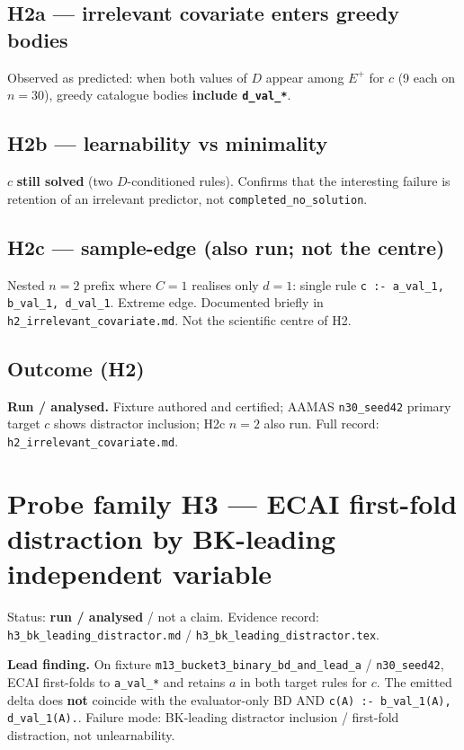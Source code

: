 \documentclass[11pt]{article}
\begin{document}
\subsection{H2a --- irrelevant covariate enters greedy bodies}

Observed as predicted: when both values of \(D\) appear among \(E^+\) for \(c\)
(9 each on \(n{=}30\)), greedy catalogue bodies \textbf{include
\texttt{d\_val\_*}}.

\subsection{H2b --- learnability vs minimality}

\(c\) \textbf{still solved} (two \(D\)-conditioned rules).
Confirms that the interesting failure is retention of an irrelevant predictor,
not \texttt{completed\_no\_solution}.

\subsection{H2c --- sample-edge (also run; not the centre)}

Nested \(n{=}2\) prefix where \(C{=}1\) realises only \(d{=}1\): single rule
\texttt{c :- a\_val\_1, b\_val\_1, d\_val\_1}.
Extreme edge.
Documented briefly in \texttt{h2\_irrelevant\_covariate.md}.
Not the scientific centre of H2.

\subsection{Outcome (H2)}

\textbf{Run / analysed.}
Fixture authored and certified; AAMAS \texttt{n30\_seed42} primary target \(c\)
shows distractor inclusion; H2c \(n{=}2\) also run.
Full record: \texttt{h2\_irrelevant\_covariate.md}.

\section{Probe family H3 --- ECAI first-fold distraction by BK-leading
independent variable}

Status: \textbf{run / analysed} / not a claim.
Evidence record: \texttt{h3\_bk\_leading\_distractor.md} /
\texttt{h3\_bk\_leading\_distractor.tex}.

\textbf{Lead finding.}
On fixture \texttt{m13\_bucket3\_binary\_bd\_and\_lead\_a} /
\texttt{n30\_seed42}, ECAI first-folds to \texttt{a\_val\_*} and retains \(a\)
in both target rules for \(c\).
The emitted delta does \textbf{not} coincide with the evaluator-only BD AND
\texttt{c(A) :- b\_val\_1(A), d\_val\_1(A).}.
Failure mode: BK-leading distractor inclusion / first-fold distraction, not
unlearnability.
\end{document}
